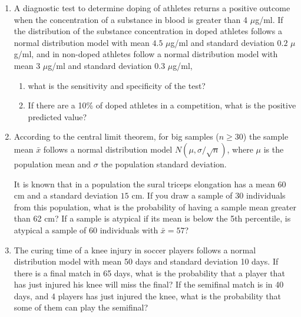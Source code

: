 \begin{enumerate}[leftmargin=*,resume]
\item A diagnostic test to determine doping of athletes returns a positive outcome when the concentration of a substance
in blood is greater than 4 $\mu$g/ml.
If the distribution of the substance concentration in doped athletes follows a normal distribution model with mean $4.5$
$\mu$g/ml and standard deviation $0.2$ $\mu$g/ml, and in non-doped athletes follow a normal distribution model with mean
$3$ $\mu$g/ml and standard deviation $0.3$ $\mu$g/ml, 
\begin{enumerate}
\item what is the sensitivity and specificity of the test?
\item If there are a 10\% of doped athletes in a competition, what is the positive predicted value? 
\end{enumerate}

\item According to the central limit theorem, for big samples ($n\geq 30$) the sample mean $\bar x$ follows a normal
distribution model $N(\mu,\sigma/\sqrt{n})$, where $\mu$ is the population mean and $\sigma$ the population standard
deviation.

It is known that in a population the sural triceps elongation has a mean $60$ cm and a standard deviation $15$ cm. 
If you draw a sample of 30 individuals from this population, what is the probability of having a sample mean greater
than 62 cm?
If a sample is atypical if its mean is below the 5th percentile, is atypical a sample of 60 individuals with $\bar
x=57$?

\item The curing time of a knee injury in soccer players follows a normal distribution model with mean 50 days and
standard deviation 10 days.
If there is a final match in 65 days, what is the probability that a player that has just injured his knee will miss the
final?
If the semifinal match is in 40 days, and 4 players has just injured the knee, what is the probability that some of them
can play the semifinal?
\end{enumerate}